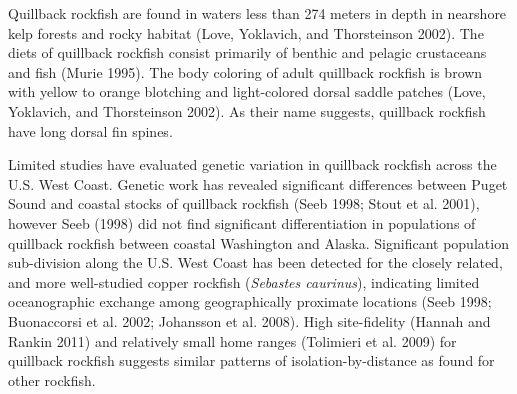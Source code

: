 \documentclass[11pt,
  english,
  a4paper,
]{article}
\begin{document}
\leavevmode\tagmcend\tagstructend\par


Quillback rockfish are found in waters less than 274 meters in depth in nearshore kelp forests and rocky habitat {(Love, Yoklavich, and Thorsteinson 2002)\leavevmode\tagmcend\tagstructend}. The diets of quillback rockfish consist primarily of benthic and pelagic crustaceans and fish {(Murie 1995)\leavevmode\tagmcend\tagstructend}. The body coloring of adult quillback rockfish is brown with yellow to orange blotching and light-colored dorsal saddle patches {(Love, Yoklavich, and Thorsteinson 2002)\leavevmode\tagmcend\tagstructend}. As their name suggests, quillback rockfish have long dorsal fin spines.

\leavevmode\tagmcend\tagstructend\par


Limited studies have evaluated genetic variation in quillback rockfish across the U.S. West Coast. Genetic work has revealed significant differences between Puget Sound and coastal stocks of quillback rockfish {(Seeb 1998; Stout et al. 2001)\leavevmode\tagmcend\tagstructend}, however Seeb {(1998)\leavevmode\tagmcend\tagstructend} did not find significant differentiation in populations of quillback rockfish between coastal Washington and Alaska. Significant population sub-division along the U.S. West Coast has been detected for the closely related, and more well-studied copper rockfish (\emph{Sebastes caurinus}), indicating limited oceanographic exchange among geographically proximate locations {(Seeb 1998; Buonaccorsi et al. 2002; Johansson et al. 2008)\leavevmode\tagmcend\tagstructend}. High site-fidelity {(Hannah and Rankin 2011)\leavevmode\tagmcend\tagstructend} and relatively small home ranges {(Tolimieri et al. 2009)\leavevmode\tagmcend\tagstructend} for quillback rockfish suggests similar patterns of isolation-by-distance as found for other rockfish.
\end{document}
